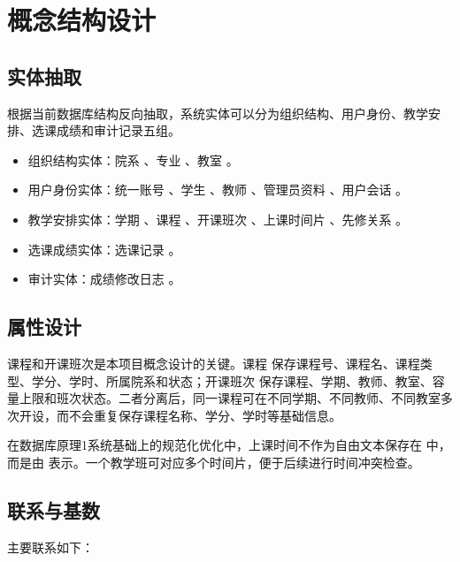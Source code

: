 \chapter{概念结构设计}

\section{实体抽取}

根据当前数据库结构反向抽取，系统实体可以分为组织结构、用户身份、教学安排、选课成绩和审计记录五组。

\begin{itemize}
  \item 组织结构实体：院系 、专业 、教室 。
  \item 用户身份实体：统一账号 、学生 、教师 、管理员资料 、用户会话 。
  \item 教学安排实体：学期 、课程 、开课班次 、上课时间片 、先修关系 。
  \item 选课成绩实体：选课记录 。
  \item 审计实体：成绩修改日志 。
\end{itemize}

\section{属性设计}

课程和开课班次是本项目概念设计的关键。课程  保存课程号、课程名、课程类型、学分、学时、所属院系和状态；开课班次  保存课程、学期、教师、教室、容量上限和班次状态。二者分离后，同一课程可在不同学期、不同教师、不同教室多次开设，而不会重复保存课程名称、学分、学时等基础信息。

在数据库原理1系统基础上的规范化优化中，上课时间不作为自由文本保存在  中，而是由  表示。一个教学班可对应多个时间片，便于后续进行时间冲突检查。

\section{联系与基数}

主要联系如下：

